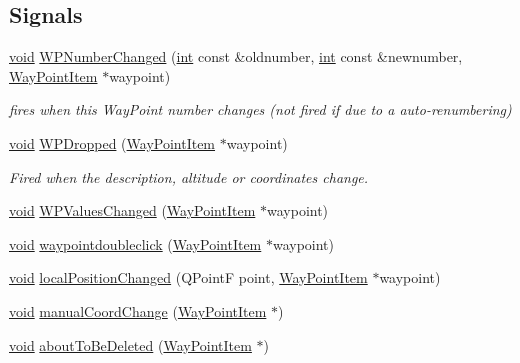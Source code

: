 \subsection*{Signals}
\begin{DoxyCompactItemize}
\item 
\hyperlink{group___u_a_v_objects_plugin_ga444cf2ff3f0ecbe028adce838d373f5c}{void} \hyperlink{group___o_p_map_widget_ga259ccf14fc1866f99af110b4b0334d74}{W\-P\-Number\-Changed} (\hyperlink{ioapi_8h_a787fa3cf048117ba7123753c1e74fcd6}{int} const \&oldnumber, \hyperlink{ioapi_8h_a787fa3cf048117ba7123753c1e74fcd6}{int} const \&newnumber, \hyperlink{classmapcontrol_1_1_way_point_item}{Way\-Point\-Item} $\ast$waypoint)
\begin{DoxyCompactList}\small\item\em fires when this Way\-Point number changes (not fired if due to a auto-\/renumbering) \end{DoxyCompactList}\item 
\hyperlink{group___u_a_v_objects_plugin_ga444cf2ff3f0ecbe028adce838d373f5c}{void} \hyperlink{group___o_p_map_widget_gae08b9a33683cbdb80ac273d6dcd75837}{W\-P\-Dropped} (\hyperlink{classmapcontrol_1_1_way_point_item}{Way\-Point\-Item} $\ast$waypoint)
\begin{DoxyCompactList}\small\item\em Fired when the description, altitude or coordinates change. \end{DoxyCompactList}\item 
\hyperlink{group___u_a_v_objects_plugin_ga444cf2ff3f0ecbe028adce838d373f5c}{void} \hyperlink{group___o_p_map_widget_gac48456e8c6628a31dc82e235dbf94c2f}{W\-P\-Values\-Changed} (\hyperlink{classmapcontrol_1_1_way_point_item}{Way\-Point\-Item} $\ast$waypoint)
\item 
\hyperlink{group___u_a_v_objects_plugin_ga444cf2ff3f0ecbe028adce838d373f5c}{void} \hyperlink{group___o_p_map_widget_ga94099ae67d892548f27f41b816f4735f}{waypointdoubleclick} (\hyperlink{classmapcontrol_1_1_way_point_item}{Way\-Point\-Item} $\ast$waypoint)
\item 
\hyperlink{group___u_a_v_objects_plugin_ga444cf2ff3f0ecbe028adce838d373f5c}{void} \hyperlink{group___o_p_map_widget_gaa25d07c9de649428ed3dd38384048404}{local\-Position\-Changed} (Q\-Point\-F point, \hyperlink{classmapcontrol_1_1_way_point_item}{Way\-Point\-Item} $\ast$waypoint)
\item 
\hyperlink{group___u_a_v_objects_plugin_ga444cf2ff3f0ecbe028adce838d373f5c}{void} \hyperlink{group___o_p_map_widget_ga976918f8397d48a08ae2af24e0ab219c}{manual\-Coord\-Change} (\hyperlink{classmapcontrol_1_1_way_point_item}{Way\-Point\-Item} $\ast$)
\item 
\hyperlink{group___u_a_v_objects_plugin_ga444cf2ff3f0ecbe028adce838d373f5c}{void} \hyperlink{group___o_p_map_widget_ga7ab7e29d2f8728b8fb7e804f0f2a34ed}{about\-To\-Be\-Deleted} (\hyperlink{classmapcontrol_1_1_way_point_item}{Way\-Point\-Item} $\ast$)
\end{DoxyCompactItemize}
